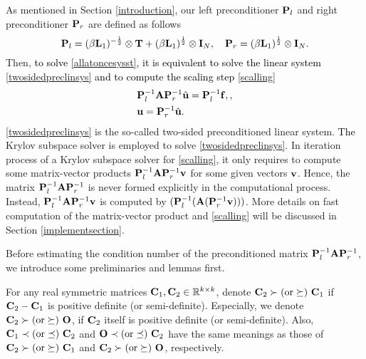 \documentclass[11pt]{article}%
\numberwithin{equation}{section}
\begin{document}
As mentioned in Section \ref{introduction}, our left preconditioner ${\bf P}_l$ and right preconditioner ${\bf P}_r$ are defined as follows
\begin{equation*}
{\bf P}_l=(\beta{\bf L}_{1})^{-\frac{1}{2}}\otimes{\bf T}+(\beta{\bf L}_{1})^{\frac{1}{2}}\otimes{\bf I}_N,\quad {\bf P}_r=(\beta{\bf L}_{1})^{\frac{1}{2}}\otimes{\bf I}_N.
\end{equation*}
Then, \textcolor{black}{to solve \eqref{allatoncesysst}, it is equivalent to solve the linear system \eqref{twosidedpreclinsys} and to compute the scaling step \eqref{scalling}}
\begin{align}
&{\bf P}_l^{-1}{\bf A}{\bf P}_r^{-1}\hat{\bf u}={\bf P}_l^{-1}{\bf f},\label{twosidedpreclinsys},\\
&{\bf u}={\bf P}_r^{-1}\hat{\bf u}.\label{scalling}
\end{align}
\eqref{twosidedpreclinsys} is the so-called two-sided preconditioned linear system. \textcolor{black}{The} Krylov subspace solver is employed to solve \eqref{twosidedpreclinsys}. In iteration process of a Krylov subspace solver for \eqref{scalling}, it only requires to compute some matrix-vector products ${\bf P}_l^{-1}{\bf A}{\bf P}_r^{-1}{\bf v}$ for some given vectors ${\bf v}$. Hence, the matrix ${\bf P}_l^{-1}{\bf A}{\bf P}_r^{-1}$ is never formed explicitly in the computational process. Instead, ${\bf P}_l^{-1}{\bf A}{\bf P}_r^{-1}{\bf v}$ is computed by $({\bf P}_l^{-1}({\bf A}({\bf P}_r^{-1}{\bf v})))$. 
More details on fast computation of the matrix-vector product and \eqref{scalling} will be discussed in Section \ref{implementsection}.


Before estimating the condition number of the preconditioned matrix ${\bf P}_l^{-1}{\bf A}{\bf P}_r^{-1}$, we introduce some preliminaries and lemmas first.







For any real symmetric matrices ${\bf C}_1,{\bf C}_2\in\mathbb{R}^{k\times k}$, denote ${\bf C}_2 \succ ({\rm or} \succeq) \ {\bf C}_1$
if ${\bf C}_2-{\bf C}_1$ is positive definite (or semi-definite). Especially, we denote ${\bf C}_2 \succ ({\rm or} \succeq) \ {\bf O}$, if ${\bf C}_2$ itself is positive definite (or semi-definite).
Also, ${\bf C}_1 \prec ({\rm or} \preceq) \ {\bf C}_2$ and ${\bf O} \prec ({\rm or} \preceq) \ {\bf C}_2$  have the same meanings as those of ${\bf C}_2 \succ ({\rm or} \succeq) \ {\bf C}_1$ and ${\bf C}_2 \succ ({\rm or} \succeq) \ {\bf O}$, respectively.
\end{document}
